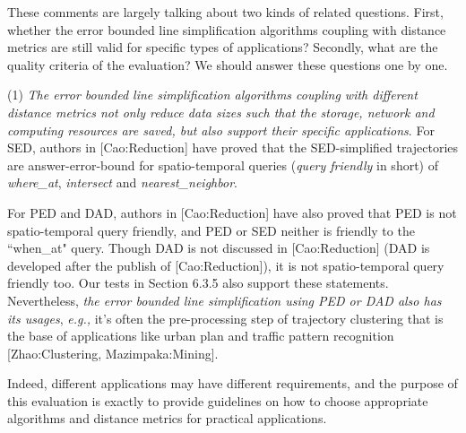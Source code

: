 \documentclass{letter}
\newcommand{\ie}{\emph{i.e.,}\xspace}
\newcommand{\eg}{\emph{e.g.,}\xspace}
\begin{document}
These comments are largely talking about two kinds of related questions. First, whether the error bounded line simplification algorithms coupling with distance metrics are still valid for specific types of applications? Secondly, what are the quality criteria of the evaluation? We should answer these questions one by one.

(1) \emph{The error bounded line simplification algorithms coupling with different distance metrics not only reduce data sizes such that the storage, network and computing resources are saved, but also support their specific applications}. For SED, authors in [Cao:Reduction] have proved that the SED-simplified trajectories are answer-error-bound for spatio-temporal queries (\emph{query friendly} in short) of \emph{where\_at}, \emph{intersect} and \emph{nearest\_neighbor}.  %

For PED and DAD, authors in [Cao:Reduction] have also proved that PED is not spatio-temporal query friendly, and PED or SED neither is friendly to the ``when\_at" query. Though DAD is not discussed in [Cao:Reduction] (DAD is developed after the publish of [Cao:Reduction]), it is not spatio-temporal query friendly too. Our tests in Section 6.3.5 also support these statements. Nevertheless, \emph{the error bounded line simplification using PED or DAD also has its usages}, \eg it's often the pre-processing step of trajectory clustering that is the base of applications like urban plan and traffic pattern recognition [Zhao:Clustering, Mazimpaka:Mining]. %


Indeed, different applications may have different requirements, and the purpose of this evaluation is exactly to provide guidelines on how to choose appropriate algorithms and distance metrics for practical applications.
\end{document}
